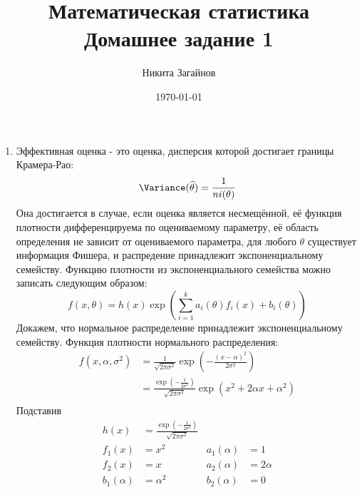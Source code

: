 \documentclass{article}
\title{Математическая статистика \\ Домашнее задание 1}
\author{Никита Загайнов}
\date{\today}
\begin{document}
\maketitle

\begin{enumerate}
	\item
	      Эффективная оценка - это оценка, дисперсия которой
	      достигает границы Крамера-Рао:
	      \[
		      \Variance(\widehat{\theta}) = \frac{1}{ni(\theta)}
	      \]
	      Она достигается в случае, если оценка является несмещённой,
	      её функция плотности дифференцируема по оцениваемому параметру,
	      её область определения не зависит от оцениваемого параметра,
	      для любого $\theta$ существует информация Фишера, и распредение
	      принадлежит экспоненциальному семейству.
	      Функцию плотности из экспоненциального семейства можно записать
	      следующим образом:
	      \[
		      f(x, \theta) = h(x) \exp\left(
		      \sum_{i=1}^k a_i(\theta) f_i(x) + b_i(\theta) \right)
	      \]
	      Докажем, что нормальное распределение принадлежит экспоненциальному
	      семейству.
	      Функция плотности нормального распределения:
	      \begin{equation*}
		      \begin{aligned}
			      f(x, \alpha, \sigma^2) & = \frac{1}{\sqrt{2\pi\sigma^2}}
			      \exp\left(-\frac{(x - \alpha)^2}{2\sigma^2}\right)                                               \\
			                             & = \frac{\exp \left( -\frac{1}{2\sigma^2} \right) }{\sqrt{2\pi\sigma^2}}
			      \exp\left( x^2 + 2\alpha x + \alpha^2 \right)                                                    \\
		      \end{aligned}
	      \end{equation*}
	      Подставив
	      \begin{equation*}
		      \begin{aligned}
			      h(x)        & = \frac{\exp \left( -\frac{1}{2\sigma^2} \right) }{\sqrt{2\pi\sigma^2}} &             &           \\
			      f_1(x)      & = x^2                                                                   & a_1(\alpha) & = 1       \\
			      f_2(x)      & = x                                                                     & a_2(\alpha) & = 2\alpha \\
			      b_1(\alpha) & = \alpha^2                                                              & b_2(\alpha) & = 0       \\
		      \end{aligned}
	      \end{equation*}


\end{enumerate}
\end{document}
